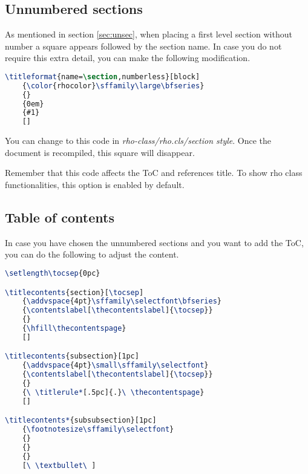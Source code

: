 \documentclass[9pt,a4paper,twoside]{rho-class/rho}
\begin{document}
    \subsection{Unnumbered sections}

        As mentioned in section \ref{sec:unsec}, when placing a first level section without number a square appears followed by the section name. In case you do not require this extra detail, you can make the following modification.

\nolinenumbers
\begin{lstlisting}[language=TeX, caption=Alternative unnumbered section.]
\titleformat{name=\section,numberless}[block]
    {\color{rhocolor}\sffamily\large\bfseries}
    {}
    {0em}
    {#1}
    []
\end{lstlisting}
\linenumbers

        You can change to this code in \textit{rho-class/rho.cls/section style}. Once the document is recompiled, this square will disappear. 

        Remember that this code affects the ToC and references title. To show rho class functionalities, this option is enabled by default.

    \subsection{Table of contents}
    
        In case you have chosen the unnumbered sections and you want to add the ToC, you can do the following to adjust the content.

\nolinenumbers
\begin{lstlisting}[language=TeX, caption=ToC when unnumbered section is chosen.]
\setlength\tocsep{0pc}

\titlecontents{section}[\tocsep]
    {\addvspace{4pt}\sffamily\selectfont\bfseries}
    {\contentslabel[\thecontentslabel]{\tocsep}}
    {}
    {\hfill\thecontentspage}
    []

\titlecontents{subsection}[1pc]
    {\addvspace{4pt}\small\sffamily\selectfont}
    {\contentslabel[\thecontentslabel]{\tocsep}}
    {}
    {\ \titlerule*[.5pc]{.}\ \thecontentspage}
    []

\titlecontents*{subsubsection}[1pc]
    {\footnotesize\sffamily\selectfont}
    {}
    {}
    {}
    [\ \textbullet\ ]
\end{lstlisting}
\linenumbers
\end{document}
